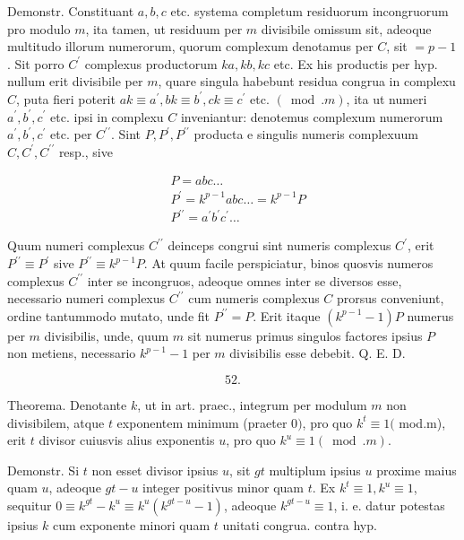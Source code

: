 \documentclass[10pt]{article}
\begin{document}
Demonstr. Constituant \(a, b, c\) etc. systema completum residuorum incongruorum pro modulo \(m\), ita tamen, ut residuum per \(m\) divisibile omissum sit, adeoque multitudo illorum numerorum, quorum complexum denotamus per \(C\), sit \(=p-1\). Sit porro \(C^{\prime}\) complexus productorum \(k a, k b, k c\) etc. Ex his productis per hyp. nullum erit divisibile per \(m\), quare singula habebunt residua congrua in complexu \(C\), puta fieri poterit \(a k \equiv a^{\prime}, b k \equiv b^{\prime}, c k \equiv c^{\prime}\) etc. \((\bmod . m)\), ita ut numeri \(a^{\prime}, b^{\prime}, c^{\prime}\) etc. ipsi in complexu \(C\) inveniantur: denotemus complexum numerorum \(a^{\prime}, b^{\prime}, c^{\prime}\) etc. per \(C^{\prime \prime}\). Sint \(P, P^{\prime}, P^{\prime \prime}\) producta e singulis numeris complexuum \(C, C^{\prime}, C^{\prime \prime}\) resp., sive

\[
\begin{aligned}
& P=a b c \ldots \\
& P^{\prime}=k^{p-1} a b c \ldots=k^{p-1} P \\
& P^{\prime \prime}=a^{\prime} b^{\prime} c^{\prime} \ldots
\end{aligned}
\]

Quum numeri complexus \(C^{\prime \prime}\) deinceps congrui sint numeris complexus \(C^{\prime}\), erit \(P^{\prime \prime} \equiv P^{\prime}\) sive \(P^{\prime \prime} \equiv k^{p-1} P\). At quum facile perspiciatur, binos quosvis numeros complexus \(C^{\prime \prime}\) inter se incongruos, adeoque omnes inter se diversos esse, necessario numeri complexus \(C^{\prime \prime}\) cum numeris complexus \(C\) prorsus conveniunt, ordine tantummodo mutato, unde fit \(P^{\prime \prime}=P\). Erit itaque \(\left(k^{p-1}-1\right) P\) numerus per \(m\) divisibilis, unde, quum \(m\) sit numerus primus singulos factores ipsius \(P\) non metiens, necessario \(k^{p-1}-1\) per \(m\) divisibilis esse debebit. Q. E. D.

\[
52 .
\]

Theorema. Denotante \(k\), ut in art. praec., integrum per modulum \(m\) non divisibilem, atque \(t\) exponentem minimum (praeter 0\()\), pro quo \(k^{t} \equiv 1(\) mod.m), erit \(t\) divisor cuiusvis alius exponentis \(u\), pro quo \(k^{u} \equiv 1(\bmod . m)\).

Demonstr. Si \(t\) non esset divisor ipsius \(u\), sit \(g t\) multiplum ipsius \(u\) proxime maius quam \(u\), adeoque \(g t-u\) integer positivus minor quam \(t\). Ex \(k^{t} \equiv 1, k^{u} \equiv 1\), sequitur \(0 \equiv k^{g t}-k^{u} \equiv k^{u}\left(k^{g t-u}-1\right)\), adeoque \(k^{g t-u} \equiv 1\), i. e. datur potestas ipsius \(k\) cum exponente minori quam \(t\) unitati congrua. contra hyp.
\end{document}
